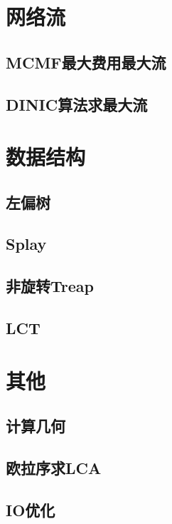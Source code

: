 \documentclass[a4paper,12pt]{article}
\begin{document}
\section{网络流}

\subsection{MCMF最大费用最大流}

\subsection{DINIC算法求最大流}


\section{数据结构}

\subsection{左偏树}

\subsection{Splay}

\subsection{非旋转Treap}

\subsection{LCT}


\section{其他}

\subsection{计算几何}

\subsection{欧拉序求LCA}

\subsection{IO优化}



\label{LastPage}
\end{document}
